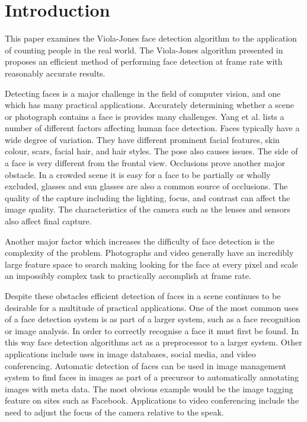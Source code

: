 \documentclass[conference]{IEEEtran}
\begin{document}




%
\IEEEpeerreviewmaketitle



\section{Introduction} \label{sec:introduction}
This paper examines the Viola-Jones face detection algorithm \cite{viola2004robust} to the application of counting people in the real world. The Viola-Jones algorithm presented in \cite{viola2004robust} proposes an efficient method of performing face detection at frame rate with reasonably accurate results.

Detecting faces is a major challenge in the field of computer vision, and one which has many practical applications. Accurately determining whether a scene or photograph contains a face is provides many challenges. Yang et al. \cite{yang2002detecting} lists a number of different factors affecting human face detection. Faces typically have a wide degree of variation. They have different prominent facial features, skin colour, scars, facial hair, and hair styles. The pose also causes issues. The side of a face is very different from the frontal view. Occlusions prove another major obstacle. In a crowded scene it is easy for a face to be partially or wholly excluded, glasses and sun glasses are also a common source of occlusions. The quality of the capture including the lighting, focus, and contrast can affect the image quality. The characteristics of the camera such as the lenses and sensors also affect final capture.

Another major factor which increases the difficulty of face detection is the complexity of the problem. Photographs and video generally have an incredibly large feature space to search making looking for the face at every pixel and scale an impossibly complex task to practically accomplish at frame rate.

Despite these obstacles efficient detection of faces in a scene continues to be desirable for a multitude of practical applications. One of the most common uses of a face detection system is as part of a larger system, such as a face recognition or image analysis. In order to correctly recognise a face it must first be found. In this way face detection algorithms act as a preprocessor to a larger system. Other applications include uses in image databases, social media, and video conferencing. Automatic detection of faces can be used in image management system to find faces in images as part of a precursor to automatically annotating images with meta data. The most obvious example would be the image tagging feature on sites such as Facebook. Applications to video conferencing include the need to adjust the focus of the camera relative to the speak. 
\end{document}
